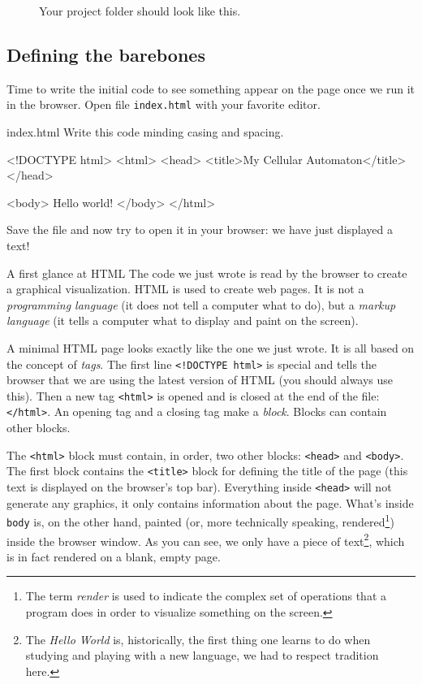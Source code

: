 %
\begin{figure}[b]
\sidecaption

%
%
\caption{Your project folder should look like this.}
\label{fig:dirstruct1}
\end{figure}
%

\subsection{Defining the barebones}
Time to write the initial code to see something appear on the page once we run it in the browser.
Open file \texttt{index.html} with your favorite editor.

\begin{programcode}{index.html}
Write this code minding casing and spacing.
\begin{codehtml}
<!DOCTYPE html>
<html>
<head>
  <title>My Cellular Automaton</title>
</head>

<body>
  Hello world!
</body>
</html>
\end{codehtml}
\end{programcode}

Save the file and now try to open it in your browser: we have just displayed a text!

\begin{tips}{A first glance at HTML}
The code we just wrote is read by the browser to create a graphical visualization. HTML is used to
create web pages. It is not a \textit{programming language} (it does not tell a computer what to do),
but a \textit{markup language} (it tells a computer what to display and paint on the screen).

A minimal HTML page looks exactly like the one we just wrote.
It is all based on the concept of \textit{tags}. The
first line \texttt{<!DOCTYPE html>} is special and tells the browser that we are using the latest
version of HTML (you should always use this). Then a new tag \texttt{<html>} is opened and is
closed at the end of the file: \texttt{</html>}. An opening tag and a closing tag make a \textit{block}.
Blocks can contain other blocks.

The \texttt{<html>} block must contain, in order, two other blocks:
\texttt{<head>} and \texttt{<body>}. The first block contains the \texttt{<title>}
block for defining the title of the page
(this text is displayed on the browser's top bar). Everything inside \texttt{<head>} will not generate any 
graphics, it only contains information about the page. What's inside \texttt{body} is, on the other hand, 
painted (or, more technically speaking, rendered\footnote{The term \textit{render} is used to indicate
the complex set of operations that a program does in order to visualize something on the screen.})
inside the browser window. As you can see, we only have a piece of 
text\footnote{The \textit{Hello World} is, historically, the first thing one learns
to do when studying and playing with a new language, we had to respect tradition here.}, which
is in fact rendered on a blank, empty page.
\end{tips}

